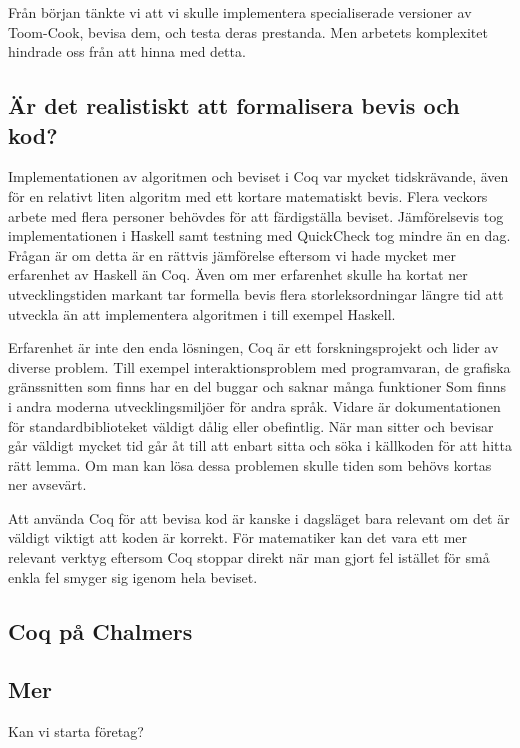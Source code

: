Från början tänkte vi att vi skulle implementera specialiserade versioner av
Toom-Cook, bevisa dem, och testa deras prestanda. Men arbetets komplexitet
hindrade oss från att hinna med detta.

\subsection{Är det realistiskt att formalisera bevis och kod?}
Implementationen av algoritmen och beviset i Coq var mycket tidskrävande, även
för en relativt liten algoritm med ett kortare matematiskt bevis. Flera veckors
arbete med flera personer behövdes för att färdigställa beviset. Jämförelsevis
tog implementationen i Haskell samt testning med QuickCheck tog mindre än en
dag. Frågan är om detta är en rättvis jämförelse eftersom vi hade mycket mer
erfarenhet av Haskell än Coq. Även om mer erfarenhet skulle ha kortat ner
utvecklingstiden markant tar formella bevis flera storleksordningar längre tid
att utveckla än att implementera algoritmen i till exempel Haskell.

Erfarenhet är inte den enda lösningen, Coq är ett forskningsprojekt och lider
av diverse problem. Till exempel interaktionsproblem med programvaran, de
grafiska gränssnitten som finns har en del buggar och saknar många funktioner
Som finns i andra moderna utvecklingsmiljöer för andra språk. Vidare är
dokumentationen för standardbiblioteket väldigt dålig eller obefintlig. När man
sitter och bevisar går väldigt mycket tid går åt till att enbart sitta och söka
i källkoden för att hitta rätt lemma. Om man kan lösa dessa problemen skulle
tiden som behövs kortas ner avsevärt.

Att använda Coq för att bevisa kod är kanske i dagsläget bara relevant om det
är väldigt viktigt att koden är korrekt. För matematiker kan det vara ett mer
relevant verktyg eftersom Coq stoppar direkt när man gjort fel istället för små
enkla fel smyger sig igenom hela beviset.

\subsection{Coq på Chalmers}

\subsection{Mer}
Kan vi starta företag?
